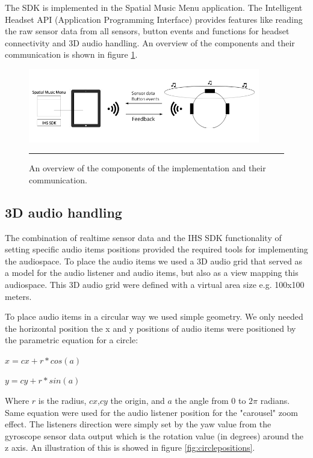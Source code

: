 The SDK is implemented in the Spatial Music Menu application. The Intelligent Headset API (Application Programming Interface) provides features like reading the raw sensor data from all sensors, button events and functions for headset connectivity and 3D audio handling. An overview of the components and their communication is shown in figure \ref{fig:implementationoverview}.

\begin{figure}[b]
	\centering
		\includegraphics[width=0.9\textwidth,height=\textheight,keepaspectratio]{./Figures/implementation_overview.png}
		\rule{35em}{1pt}
	\caption[Implementation overview]{An overview of the components of the implementation and their communication.}
	\label{fig:implementationoverview}
\end{figure}

\subsection{3D audio handling}
The combination of realtime sensor data and the IHS SDK functionality of setting specific audio items positions provided the required tools for implementing the audiospace. To place the audio items we used a 3D audio grid that served as a model for the audio listener and audio items, but also as a view mapping this audiospace. This 3D audio grid were defined with a virtual area size e.g. 100x100 meters.

To place audio items in a circular way we used simple geometry. We only needed the horizontal position the x and y positions of audio items were positioned by the parametric equation for a circle:

$x = cx + r * cos(a)$

$y = cy + r * sin(a)$

Where $r$ is the radius, $cx$,$cy$ the origin, and $a$ the angle from $0$ to $2\pi$ radians. Same equation were used for the audio listener position for the "carousel" zoom effect. The listeners direction were simply set by the yaw value from the gyroscope sensor data output which is the rotation value (in degrees) around the z axis. An illustration of this is showed in figure \ref{fig:circlepositions}.

